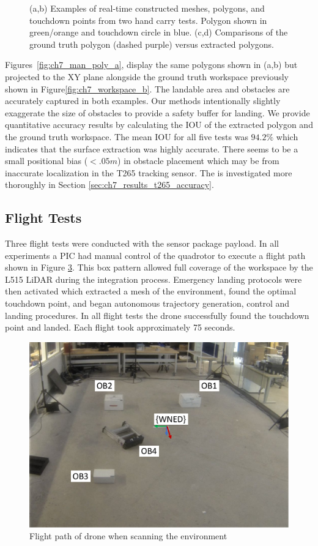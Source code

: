 \begin{figure}[!htb]
\begin{subfigure}[t]{.33\linewidth}
    \caption{\label{fig:ch7_man_poly_b}}
  \end{subfigure}
   \caption[Real-time constructed meshes and polygons during hand carry test]{(a,b) Examples of real-time constructed meshes, polygons, and touchdown points from two hand carry tests. Polygon shown in green/orange and touchdown circle in blue. (c,d) Comparisons of the ground truth polygon (dashed purple) versus extracted polygons.} \label{fig:ch7_mesh_handcarry}
\end{figure}

Figures~\ref{fig:ch7_man_poly_a}, display the same polygons shown in (a,b) but projected to the XY plane alongside the ground truth workspace previously shown in Figure\ref{fig:ch7_workspace_b}. The landable area and obstacles are accurately captured in both examples. Our methods intentionally slightly exaggerate the size of obstacles to provide a safety buffer for landing.  We provide quantitative accuracy results by calculating the \ac{IOU} of the extracted polygon and the ground truth workspace.  The mean \ac{IOU} for all five tests was $94.2\%$ which indicates that the surface extraction was highly accurate. There seems to be a small positional bias ($< .05m$) in obstacle placement which may be from inaccurate localization in the T265 tracking sensor. The is investigated more thoroughly in Section \ref{sec:ch7_results_t265_accuracy}.


\subsection{Flight Tests} \label{sec:ch7_results_flight}

Three flight tests were conducted with the sensor package payload. In all experiments a \ac{PIC} had manual control of the quadrotor to execute a flight path shown in Figure \ref{fig:ch7_flight_path}. This box pattern allowed full coverage of the workspace by the L515 LiDAR during the integration process. Emergency landing protocols were then activated which extracted a mesh of the environment, found the optimal touchdown point, and began autonomous trajectory generation, control and landing procedures. In all flight tests the drone successfully found the touchdown point and landed. Each flight took approximately 75 seconds.

\begin{figure}[!tb]
    \centering  
    \includegraphics[page=3,clip,trim=0cm 0cm 0cm 0cm,width=.45\linewidth]{chapter_7_experiments/imgs/ExperimentSetup.pdf}
    \caption[Flight path for scanning environment]{Flight path of drone when scanning the environment}\label{fig:ch7_flight_path}
\end{figure}

